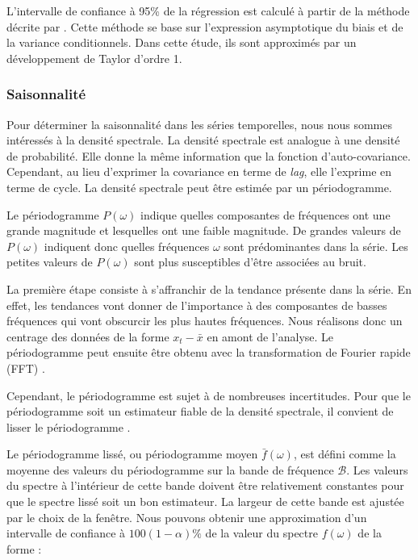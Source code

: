 \documentclass[12pt]{article}
\begin{document}
L'intervalle de confiance à 95\% de la régression est calculé à partir de la méthode décrite par \citet{Fan1996}. Cette méthode se base sur l’expression asymptotique du biais et de la variance conditionnels. Dans cette étude, ils sont approximés par un développement de Taylor d’ordre 1. 

\subsubsection{Saisonnalité}

Pour déterminer %
la saisonnalité dans les séries temporelles, nous nous sommes intéressés à la densité spectrale. La densité spectrale est analogue à une densité de probabilité. Elle donne la même information que la fonction d’auto-covariance. Cependant, au lieu d’exprimer la covariance en terme de \textit{lag}, elle l’exprime en terme de cycle. La densité spectrale peut être estimée par un périodogramme. 

Le périodogramme $P(\omega)$ indique quelles composantes de fréquences ont une grande magnitude et lesquelles ont une faible magnitude. De grandes valeurs de $P(\omega)$ indiquent donc quelles fréquences $\omega$ sont prédominantes dans la série. Les petites valeurs de $P(\omega)$ sont plus susceptibles d'être associées au bruit. 

La première étape consiste à s'affranchir de la tendance présente dans la série. En effet, les tendances vont donner de l'importance à des composantes de basses fréquences qui vont obscurcir les plus hautes fréquences. Nous réalisons donc un centrage des données de la forme $x_t-\bar{x}$ en amont de l’analyse. Le périodogramme peut ensuite être obtenu avec la transformation de Fourier rapide (FFT) \citep{Shumway2016}. 

Cependant, le périodogramme est sujet à de nombreuses incertitudes. Pour que le périodogramme soit un estimateur fiable de la densité spectrale, il convient de lisser le périodogramme \citep{Shumway2016}. 


Le périodogramme lissé, ou périodogramme moyen $\bar{f}(\omega)$, est défini comme la moyenne des valeurs du périodogramme sur la bande de fréquence $\mathcal B$. Les valeurs du spectre à l'intérieur de cette bande doivent être relativement constantes pour que le spectre lissé soit un bon estimateur. La largeur de cette bande est ajustée par le choix de la fenêtre. Nous pouvons obtenir une approximation d'un intervalle de confiance à $100(1-\alpha)\%$ de la valeur du spectre $f(\omega)$ de la forme \citep{Shumway2016} :
\end{document}
